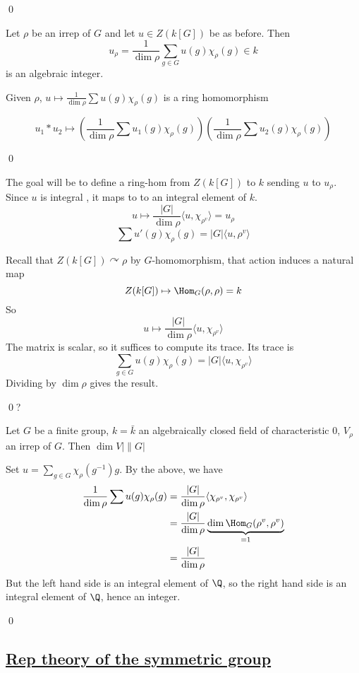 \documentclass[x11names,reqno,14pt]{extarticle}
\newcommand{\bark}{\bar{k}}
\begin{document}
\qed

\cor

Let $\rho$ be an irrep of $G$ and let $u \in Z(k[G])$ be as before. Then
\[
u_\rho = \frac{1}{\dim\rho}\sum_{g\in G}u(g)\chi_\rho(g) \in k
\]
is an algebraic integer. 

\proof

\claim

Given $\rho$, $u \mapsto\frac{1}{\dim\rho}\sum u(g)\chi_\rho(g)$ is a ring homomorphism

\proof

\[
u_1 * u_2 \mapsto \left(\frac{1}{\dim\rho}\sum u_1(g)\chi_\rho(g)\right)\left(\frac{1}{\dim\rho}\sum u_2(g)\chi_\rho(g)\right)
\]

\qed

The goal will be to define a ring-hom from $Z(k[G])$ to $k$ sending $u$ to $u_\rho$. Since $u$ is integral , it maps to to an integral element of $k$. 
\[
u \mapsto \frac{|G|}{\dim\rho}\langle u, \chi_{\rho^v}\rangle = u_\rho
\]
\[
\sum u'(g)\chi_\rho(g) = |G|\langle u, \rho^v\rangle
\]

Recall that $Z(k[G]) \curvearrowright\rho$ by $G$-homomorphism, that action induces a natural map 
\[
Z(k[G]) \mapsto \Hom_G(\rho,\rho) = k
\]
So
\[
u \mapsto \frac{|G|}{\dim\rho}\langle u,\chi_{\rho^v}\rangle
\]
The matrix is scalar, so it suffices to compute its trace. Its trace is 
\[
\sum_{g\in G} u(g)\chi_{\rho}(g) = |G|\langle u,\chi_{\rho^v}\rangle
\]
Dividing by $\dim\rho$ gives the result. 

\qed ?

\thm

Let $G$ be a finite group, $k = \bark$ an algebraically closed field of characteristic 0, $V_\rho$ an irrep of $G$. Then $\dim V \mid \|G|$

\proof

Set $u = \sum_{g\in G}\chi_\rho(g^{-1})g$. By the above, we have 
\begin{align*}
\frac{1}{\dim\rho}\sum u(g)\chi_\rho(g) & = \frac{|G|}{\dim\rho}\langle\chi_{\rho^v},\chi_{\rho^v}\rangle \\
& = \frac{|G|}{\dim\rho}\underbrace{\dim\Hom_G(\rho^v,\rho^v)}_{=1} \\
& = \frac{|G|}{\dim\rho}
\end{align*}
But the left hand side is an integral element of $\Q$, so the right hand side is an integral element of $\Q$, hence an integer. 

\qed

\subsection*{\underline{Rep theory of the symmetric group}}
\end{document}
